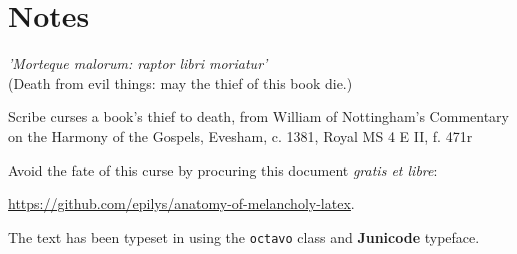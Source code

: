 \documentclass[titlepage,12pt,royal]{octavo}
\begin{document}
\chapter{Notes}
\backmatter
{}
\nocite{*}
\thispagestyle{empty}
\clearpage
\thispagestyle{empty}
\colophontitlesize{18pt}
\colophonparsize{10pt}
\begin{colophon}
\epigraph{\footnotesize\textit{'Morteque malorum: raptor libri moriatur'}\\(Death from evil things: may the thief of this book die.)}{\scriptsize{}Scribe curses a book’s thief to death, from William of Nottingham’s Commentary on the Harmony of the Gospels, Evesham, c. 1381, Royal MS 4 E II, f. 471r}
Avoid the fate of this curse by procuring this document \emph{gratis et libre}:

  \href{https://github.com/epilys/anatomy-of-melancholy-latex}{\underline{https://github.com/epilys/anatomy-of-melancholy-latex}}.

  The text has been typeset in \XeLaTeX{} using the \texttt{octavo} class and \textbf{Junicode} typeface.
\end{colophon}
\clearpage{}
 \label{backcover}
\end{document}
